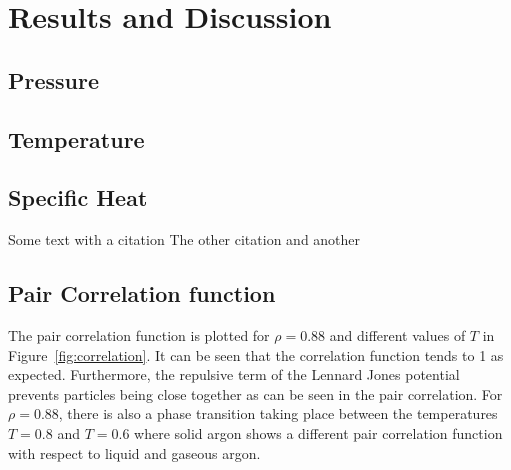 \documentclass[
10pt, %
a4paper, %
oneside, %
headinclude,footinclude, %
BCOR5mm, %
]{scrartcl}
\begin{document}
\newpage

\section{Results and Discussion}

\subsection{Pressure}

\subsection{Temperature}



\subsection{Specific Heat}




Some text with a citation \cite{Verlet:1967md}
The other citation \cite{Glosser:2015iccp} and another\cite{Thijssen:2013cp}


\subsection{Pair Correlation function}

The pair correlation function is plotted for $\rho = 0.88$ and different values of $T$ in Figure~\vref{fig:correlation}. It can be seen that the correlation function tends to 1 as expected. Furthermore, the repulsive term of the Lennard Jones potential prevents particles being close together as can be seen in the pair correlation. For $\rho = 0.88$, there is also a phase transition taking place between the temperatures $T=0.8$ and $T=0.6$ where solid argon shows a different pair correlation function with respect to liquid and gaseous argon.

\end{document}
